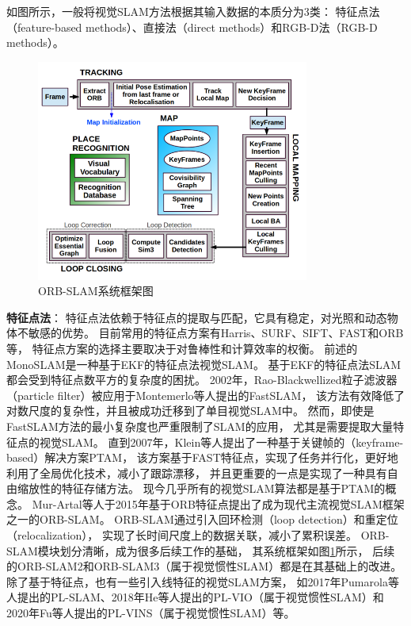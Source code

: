 如图所示，一般将视觉SLAM方法根据其输入数据的本质分为3类\cite{servieres2021visual}：
特征点法（feature-based methods）、直接法（direct methods）和RGB-D法（RGB-D methods）。

\begin{figure}[htbp]
    \centering
    \includegraphics[width = 0.8\textwidth]{figures/orb_slam_system_overview.png}
    \caption{ORB-SLAM系统框架图\cite{mur2015orb}}
    \label{fig:orb_slam_system_overview}
\end{figure}

\textbf{特征点法}：
特征点法依赖于特征点的提取与匹配，它具有稳定，对光照和动态物体不敏感的优势。
目前常用的特征点方案有Harris\cite{si1988combined}、SURF\cite{bay2006surf}、SIFT\cite{lowe2004distinctive}、FAST\cite{rosten2006machine}和ORB\cite{rublee2011orb}等，
特征点方案的选择主要取决于对鲁棒性和计算效率的权衡。
前述的MonoSLAM\cite{davison2007monoslam}是一种基于EKF的特征点法视觉SLAM。
基于EKF的特征点法SLAM都会受到特征点数平方的复杂度的困扰。
2002年，Rao-Blackwellized粒子滤波器（particle filter）被应用于Montemerlo等人提出的FastSLAM\cite{montemerlo2002fastslam}，
该方法有效降低了对数尺度的复杂性，并且被成功迁移到了单目视觉SLAM中\cite{eade2006scalable}。
然而，即使是FastSLAM方法的最小复杂度也严重限制了SLAM的应用，
尤其是需要提取大量特征点的视觉SLAM。
直到2007年，Klein等人提出了一种基于关键帧的（keyframe-based）解决方案PTAM\cite{klein2007parallel}，
该方案基于FAST特征点，实现了任务并行化，更好地利用了全局优化技术，减小了跟踪漂移，
并且更重要的一点是实现了一种具有自由缩放性的特征存储方法。
现今几乎所有的视觉SLAM算法都是基于PTAM的概念。
Mur-Artal等人于2015年基于ORB特征点提出了成为现代主流视觉SLAM框架之一的ORB-SLAM\cite{mur2015orb}。
ORB-SLAM通过引入回环检测（loop detection）和重定位（relocalization），
实现了长时间尺度上的数据关联，减小了累积误差。
ORB-SLAM模块划分清晰，成为很多后续工作的基础，
其系统框架如图\ref{fig:orb_slam_system_overview}所示，
后续的ORB-SLAM2\cite{mur2017orb}和ORB-SLAM3\cite{campos2021orb}（属于视觉惯性SLAM）都是在其基础上的改进。
除了基于特征点，也有一些引入线特征的视觉SLAM方案，
如2017年Pumarola等人提出的PL-SLAM\cite{pumarola2017pl}、2018年He等人提出的PL-VIO\cite{he2018pl}（属于视觉惯性SLAM）和2020年Fu等人提出的PL-VINS\cite{fu2020pl}（属于视觉惯性SLAM）等。

